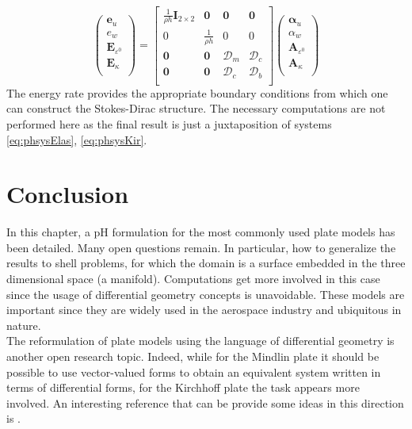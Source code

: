 \begin{equation}
\begin{pmatrix}
\bm{e}_u \\
e_w \\
\bm{E}_{\varepsilon^0} \\
\bm{E}_{\kappa} \\
\end{pmatrix}
= 
\begin{bmatrix}
\frac{1}{\rho h}\bm{I}_{2 \times 2} & \bm{0} & \bm{0} &  \bm{0} \\
0 & \frac{1}{\rho h} & 0 & 0  \\
\bm{0} & \bm{0} & \bm{\mathcal{D}}_m & \bm{\mathcal{D}}_c \\
\bm{0} & \bm{0} & \bm{\mathcal{D}}_c & \bm{\mathcal{D}}_b \\
\end{bmatrix}
\begin{pmatrix}
\bm\alpha_u \\
\alpha_w \\
\bm{A}_{\varepsilon^0} \\
\bm{A}_\kappa \\
\end{pmatrix}
\end{equation}
The energy rate provides the appropriate boundary conditions from which one can construct the Stokes-Dirac structure. The necessary computations are not performed here as the final result is just a juxtaposition of systems \eqref{eq:phsysElas}, \eqref{eq:phsysKir}.


\section{Conclusion}

In this chapter, a pH formulation for the most commonly used plate models has been detailed. Many open questions remain. In particular, how to generalize the results to shell problems, for which the domain is a surface embedded in the three dimensional space (a manifold). Computations get more involved in this case since the usage of differential geometry concepts is unavoidable. These models are important since they are widely used in the aerospace industry and ubiquitous in nature. \\

The reformulation of plate models using the language of differential geometry is another open research topic. Indeed, while for the Mindlin plate it should be possible to use vector-valued forms to obtain an equivalent system written in terms of differential forms, for the Kirchhoff plate the task appears more involved. An interesting reference that can be provide some ideas in this direction is \cite{yao2011modeling}. 
